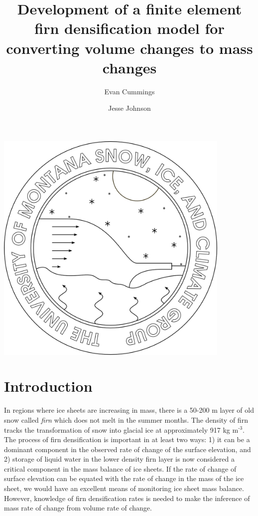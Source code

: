 \documentclass{article}%
\newcommand{\sups}[1]{\ensuremath{^{\textrm{#1}}}}
\begin{document}

\title{Development of a finite element firn densification model for converting volume changes to mass changes}
\author{Evan Cummings \and Jesse Johnson}
\maketitle
\begin{center}
\includegraphics[width=4.455666122085252in]{images/logoPlain.png}
\end{center}

\twocolumn


\section{Introduction}


In regions where ice sheets are increasing in mass, there is a 50-200 m layer of old snow called \emph{firn} which does not melt in the summer months.  The density of firn tracks the transformation of snow into glacial ice at approximately 917 kg m\sups{-3}.  The process of firn densification is important in at least two ways: 1) it can be a dominant component in the observed rate of change of the surface elevation, and 2) storage of liquid water in the lower density firn layer is now considered a critical component in the mass balance of ice sheets.  If the rate of change of surface elevation can be equated with the rate of change in the mass of the ice sheet, we would have an excellent means of monitoring ice sheet mass balance.  However, knowledge of firn densification rates is needed to make the inference of mass rate of change from volume rate of change.
\end{document}
